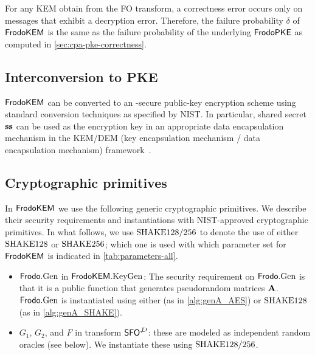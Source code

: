 For any KEM obtain from the FO transform, a correctness error occurs only on messages that exhibit a decryption error. Therefore, the failure probability $\delta$ of $\textsf{\upshape\mdseries FrodoKEM}$ is the same as the failure probability of the underlying $\textsf{\upshape\mdseries FrodoPKE}$ as computed in \autoref{sec:cpa-pke-correctness}.

\subsection{Interconversion to \INDCCA PKE}\label{sec:cca-pke}


$\textsf{\upshape\mdseries FrodoKEM}$ can be converted to an \INDCCA-secure public-key encryption scheme using standard conversion techniques as specified by NIST.  In particular, shared secret $\mathbf{s}\mathbf{s}$ can be used as the encryption key in an appropriate data encapsulation mechanism in the KEM/DEM (key encapsulation mechanism / data encapsulation mechanism) framework~\cite{CraSho03}.

\subsection{Cryptographic primitives}\label{sec:primitives}


In $\textsf{\upshape\mdseries FrodoKEM}$ we use the following generic cryptographic primitives. We
describe their security requirements and instantiations with NIST-approved
cryptographic primitives. In what follows, we use
$\textrm{\upshape\mdseries SHAKE}128/256$ to denote the use of either $\textrm{\upshape\mdseries SHAKE}128$ or $\textrm{\upshape\mdseries SHAKE}256$;
which one is used with which parameter set for $\textsf{\upshape\mdseries FrodoKEM}$ is indicated in \autoref{tab:parameters-all}.

\begin{itemize}

\item $\textsf{\upshape\mdseries Frodo}.\textrm{\upshape\mdseries Gen}$ in $\textsf{\upshape\mdseries FrodoKEM}.\textrm{\upshape\mdseries KeyGen}$: The security requirement on
  $\textsf{\upshape\mdseries Frodo}.\textrm{\upshape\mdseries Gen}$ is that it is a public function that generates pseudorandom
  matrices $\mathbf{A}$. $\textsf{\upshape\mdseries Frodo}.\textrm{\upshape\mdseries Gen}$ is instantiated using either \AESOneTwoEight
  (as in \autoref{alg:genA_AES}) or $\textrm{\upshape\mdseries SHAKE}128$ (as in
  \autoref{alg:genA_SHAKE}).

\item $G_1$, $G_2$, and $F$ in transform $\textsf{\upshape\mdseries SFO}^{\not\perp\prime}$: these are
  modeled as independent random oracles (see below). We instantiate these using $\textrm{\upshape\mdseries SHAKE}128/256$.
\end{itemize}

